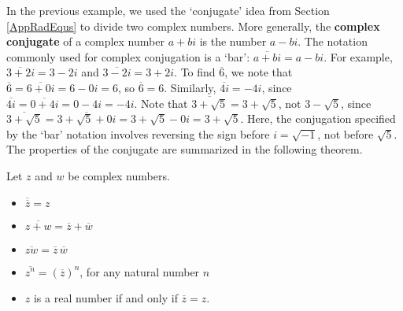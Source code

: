 In the previous example, we used the `conjugate' idea from Section \ref{AppRadEqus} to divide two complex numbers.  More generally, the \textbf{complex conjugate} of a complex number $a+bi$ is the number $a-bi$.  The notation commonly used for complex conjugation is a `bar':  $\overline{a+bi} = a-bi$. For example, $\overline{3+2i} = 3-2i$ and $\overline{3-2i} = 3+2i$. To find $\overline{6}$, we note that $\overline{6} = \overline{6+0i}= 6 - 0i = 6$, so $\overline{6} = 6$. Similarly, $\overline{4i} = -4i$, since $\overline{4i} = \overline{0 + 4i} = 0 - 4i =  -4i$.  Note that $\overline{3+\sqrt{5}} = 3 + \sqrt{5}$, not $3 - \sqrt{5}$, since  $\overline{3+\sqrt{5}} = \overline{3+\sqrt{5} + 0i} = 3+\sqrt{5}  - 0i = 3+\sqrt{5}$. Here, the conjugation specified by the `bar' notation involves reversing the sign before $i = \sqrt{-1}$, not before  $\sqrt{5}$.  The properties of the conjugate are summarized in the following theorem.


\begin{tcolorbox}
	
\begin{thm}  \label{conjugateprops} Let $z$ and $w$ be complex numbers. 

\begin{itemize}

\item  $\overline{\overline{z}} = z$

\item  $ \overline{z+w} = \overline{z} + \overline{w}$

\item  $ \overline{zw} = \overline{z} \, \overline{w}$

\item  $\overline{z^{n}} = \left(\overline{z}\right)^n$, for any natural number $n$

\item  $z$ is a real number if and only if $\overline{z} = z$.

\end{itemize}

\end{thm}

\end{tcolorbox}

\medskip

